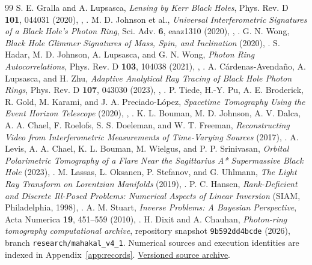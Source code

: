 \small
\begin{thebibliography}{99}
 S. E. Gralla and A. Lupsasca, \emph{Lensing by Kerr Black Holes}, Phys. Rev. D \textbf{101}, 044031 (2020), , .
 M. D. Johnson et al., \emph{Universal Interferometric Signatures of a Black Hole's Photon Ring}, Sci. Adv. \textbf{6}, eaaz1310 (2020), , .
 G. N. Wong, \emph{Black Hole Glimmer Signatures of Mass, Spin, and Inclination} (2020), .
 S. Hadar, M. D. Johnson, A. Lupsasca, and G. N. Wong, \emph{Photon Ring Autocorrelations}, Phys. Rev. D \textbf{103}, 104038 (2021), , .
 A. C\'ardenas-Avenda\~no, A. Lupsasca, and H. Zhu, \emph{Adaptive Analytical Ray Tracing of Black Hole Photon Rings}, Phys. Rev. D \textbf{107}, 043030 (2023), , .
 P. Tiede, H.-Y. Pu, A. E. Broderick, R. Gold, M. Karami, and J. A. Preciado-L\'opez, \emph{Spacetime Tomography Using the Event Horizon Telescope} (2020), , .
 K. L. Bouman, M. D. Johnson, A. V. Dalca, A. A. Chael, F. Roelofs, S. S. Doeleman, and W. T. Freeman, \emph{Reconstructing Video from Interferometric Measurements of Time-Varying Sources} (2017), .
 A. Levis, A. A. Chael, K. L. Bouman, M. Wielgus, and P. P. Srinivasan, \emph{Orbital Polarimetric Tomography of a Flare Near the Sagittarius A* Supermassive Black Hole} (2023), .
 M. Lassas, L. Oksanen, P. Stefanov, and G. Uhlmann, \emph{The Light Ray Transform on Lorentzian Manifolds} (2019), .
 P. C. Hansen, \emph{Rank-Deficient and Discrete Ill-Posed Problems: Numerical Aspects of Linear Inversion} (SIAM, Philadelphia, 1998), .
 A. M. Stuart, \emph{Inverse Problems: A Bayesian Perspective}, Acta Numerica \textbf{19}, 451--559 (2010), .
 H. Dixit and A. Chauhan, \emph{Photon-ring tomography computational archive}, repository snapshot \texttt{9b592dd4bcde} (2026), branch \texttt{research/mahakal\_v4\_1}. Numerical sources and execution identities are indexed in Appendix~\ref{app:records}. \href{https://github.com/internalerror404/photon-ring-tomography/tree/9b592dd4bcde20187922ef9d067b72abeaf12cdb}{Versioned source archive}.
\end{thebibliography}
